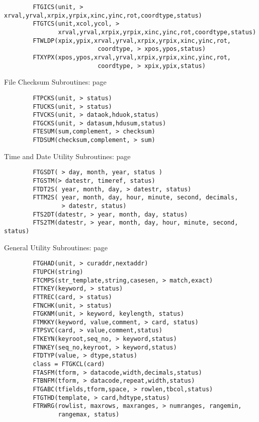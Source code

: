 \documentclass[11pt]{book}
\begin{document}
\begin{verbatim}
        FTGICS(unit, > xrval,yrval,xrpix,yrpix,xinc,yinc,rot,coordtype,status)
        FTGTCS(unit,xcol,ycol, >
               xrval,yrval,xrpix,yrpix,xinc,yinc,rot,coordtype,status)
        FTWLDP(xpix,ypix,xrval,yrval,xrpix,yrpix,xinc,yinc,rot,
                          coordtype, > xpos,ypos,status)
        FTXYPX(xpos,ypos,xrval,yrval,xrpix,yrpix,xinc,yinc,rot,
                          coordtype, > xpix,ypix,status)
\end{verbatim}
 File Checksum Subroutines: page~\pageref{FTPCKS}

\begin{verbatim}
        FTPCKS(unit, > status)
        FTUCKS(unit, > status)
        FTVCKS(unit, > dataok,hduok,status)
        FTGCKS(unit, > datasum,hdusum,status)
        FTESUM(sum,complement, > checksum)
        FTDSUM(checksum,complement, > sum)

\end{verbatim}
 Time and Date Utility Subroutines: page~\pageref{FTGSDT}

\begin{verbatim}
        FTGSDT( > day, month, year, status )
        FTGSTM(> datestr, timeref, status)
        FTDT2S( year, month, day, > datestr, status)
        FTTM2S( year, month, day, hour, minute, second, decimals,
                > datestr, status)
        FTS2DT(datestr, > year, month, day, status)
        FTS2TM(datestr, > year, month, day, hour, minute, second, status)
\end{verbatim}
 General Utility Subroutines: page~\pageref{FTGHAD}

\begin{verbatim}
        FTGHAD(unit, > curaddr,nextaddr)
        FTUPCH(string)
        FTCMPS(str_template,string,casesen, > match,exact)
        FTTKEY(keyword, > status)
        FTTREC(card, > status)
        FTNCHK(unit, > status)
        FTGKNM(unit, > keyword, keylength, status)
        FTMKKY(keyword, value,comment, > card, status)
        FTPSVC(card, > value,comment,status)
        FTKEYN(keyroot,seq_no, > keyword,status)
        FTNKEY(seq_no,keyroot, > keyword,status)
        FTDTYP(value, > dtype,status)
        class = FTGKCL(card)
        FTASFM(tform, > datacode,width,decimals,status)
        FTBNFM(tform, > datacode,repeat,width,status)
        FTGABC(tfields,tform,space, > rowlen,tbcol,status)
        FTGTHD(template, > card,hdtype,status)
        FTRWRG(rowlist, maxrows, maxranges, > numranges, rangemin,
               rangemax, status)
\end{verbatim}

\end{document}
